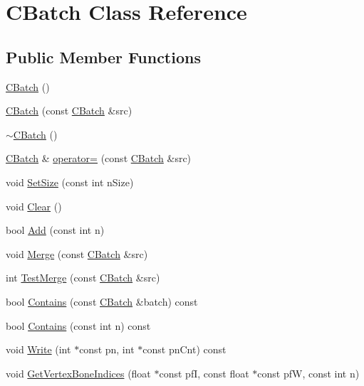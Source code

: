 \hypertarget{class_c_batch}{\section{C\+Batch Class Reference}
\label{class_c_batch}
}
\subsection*{Public Member Functions}
\begin{DoxyCompactItemize}
\item 
\hyperlink{class_c_batch_a61c0645f155afdf7bcfed00de5f2231d}{C\+Batch} ()
\item 
\hyperlink{class_c_batch_a4d0c351b4234df7e092195c526f0a365}{C\+Batch} (const \hyperlink{class_c_batch}{C\+Batch} \&src)
\item 
\hyperlink{class_c_batch_a8171b2a263b3ca733e217f7efec86ffc}{$\sim$\+C\+Batch} ()
\item 
\hyperlink{class_c_batch}{C\+Batch} \& \hyperlink{class_c_batch_af09c040da33474f653698b649934a334}{operator=} (const \hyperlink{class_c_batch}{C\+Batch} \&src)
\item 
void \hyperlink{class_c_batch_a475f0d205d3387ec322e4af535170c1a}{Set\+Size} (const int n\+Size)
\item 
void \hyperlink{class_c_batch_afd1ff8a7cb2a65e8fbaba18672299db2}{Clear} ()
\item 
bool \hyperlink{class_c_batch_a9f9873ef7c040d6dd9b17336388fe696}{Add} (const int n)
\item 
void \hyperlink{class_c_batch_ad4612721b684b0fa74e0936c525d1129}{Merge} (const \hyperlink{class_c_batch}{C\+Batch} \&src)
\item 
int \hyperlink{class_c_batch_aa5be47c8e0dfc0e236cb7dfa38ede946}{Test\+Merge} (const \hyperlink{class_c_batch}{C\+Batch} \&src)
\item 
bool \hyperlink{class_c_batch_a76b1e6c4b8fb7a65a2b2cf3c0ca66597}{Contains} (const \hyperlink{class_c_batch}{C\+Batch} \&batch) const 
\item 
bool \hyperlink{class_c_batch_a529efde7b744a22711ae6ddffad14c8b}{Contains} (const int n) const 
\item 
void \hyperlink{class_c_batch_a628a95a6e596cf2effd45cf5eabc528d}{Write} (int $\ast$const pn, int $\ast$const pn\+Cnt) const 
\item 
void \hyperlink{class_c_batch_ab5ad6d04fe2b939895a4033bc0f7d62f}{Get\+Vertex\+Bone\+Indices} (float $\ast$const pf\+I, const float $\ast$const pf\+W, const int n)
\end{DoxyCompactItemize}
